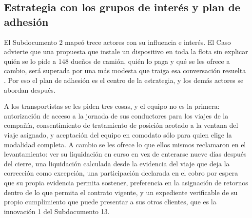
\subsection{Estrategia con los grupos de interés y plan de adhesión}\label{sec:3-adhesion}

El Subdocumento 2 mapeó trece actores con su influencia e interés. El Caso advierte que una propuesta que
instale un dispositivo en toda la flota sin explicar quién se lo pide a 148 dueños de camión, quién lo
paga y qué se les ofrece a cambio, será superada por una más modesta que traiga esa conversación resuelta
. Por eso el plan de adhesión es el centro de la estrategia, y los demás actores se
abordan después.

A los transportistas se les piden tres cosas, y el equipo no es la primera: autorización de acceso a la
jornada de sus conductores para los viajes de la compañía, consentimiento de tratamiento de posición
acotado a la ventana del viaje asignado, y aceptación del equipo en comodato sólo para quien elige la
modalidad completa. A cambio se les ofrece lo que ellos mismos reclamaron en el levantamiento: ver su
liquidación en curso en vez de enterarse nueve días después del cierre, una liquidación calculada desde
la evidencia del viaje que deja la corrección como excepción, una participación declarada en el cobro
por espera que su propia evidencia permita sostener, preferencia en la asignación de retornos dentro de
lo que permita el contrato vigente, y un expediente verificable de su propio cumplimiento que puede
presentar a sus otros clientes, que es la innovación 1 del Subdocumento 13.

